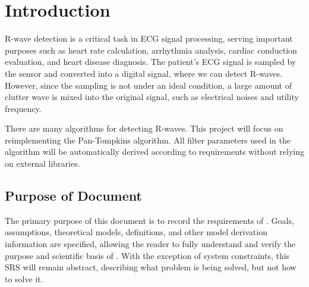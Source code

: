 \documentclass[12pt]{article}
\begin{document}


\section{Introduction}

R-wave detection is a critical task in ECG signal processing, serving important
purposes such as heart rate calculation, arrhythmia analysis, cardiac conduction
evaluation, and heart disease diagnosis.  The patient's ECG signal is sampled by
the sensor and converted into a digital signal, where we can detect R-waves.
However, since the sampling is not under an ideal condition, a large amount of
clutter wave is mixed into the original signal, such as electrical noises and
utility frequency.

There are many algorithms for detecting R-waves.  This project will focus on
reimplementing the Pan-Tompkins\cite{4122029} algorithm.  All filter parameters
used in the algorithm will be automatically derived according to requirements
without relying on external libraries.


\subsection{Purpose of Document}

The primary purpose of this document is to record the requirements of \progname.
Goals, assumptions, theoretical models, definitions, and other model derivation
information are specified, allowing the reader to fully understand and verify
the purpose and scientific basis of \progname.  With the exception of system
constraints, this SRS will remain abstract, describing what problem is being
solved, but not how to solve it.
\end{document}
